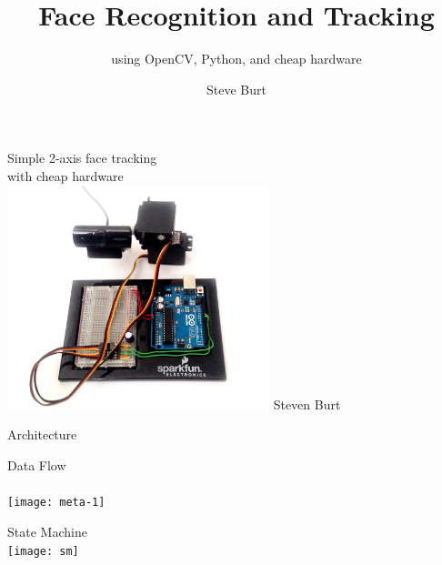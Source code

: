 \documentclass{beamer}
\title{Face Recognition and Tracking}
\subtitle{using OpenCV, Python, and cheap hardware}
\author{Steve Burt}
\begin{document}
\begin{frame}[plain]
\begin{center}
\LARGE Simple 2-axis face tracking\\
\LARGE with cheap hardware\\
\includegraphics[width=3in]{board}
\Large Steven Burt 
\end{center}
\end{frame}
\begin{frame}{Architecture}

\centering
\parbox{.45\textwidth}{  Data Flow\\ \\
\texttt{[image: meta-1]}}\parbox{.5\textwidth}{ State Machine\\\texttt{[image: sm]}}\\
\end{frame}
\end{document}
